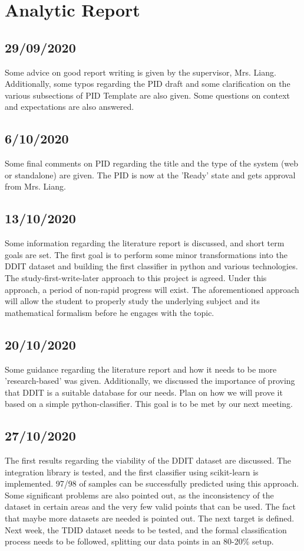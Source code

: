 \documentclass[openany]{article}
\begin{document}
	\section{Analytic Report}
		\subsection{29/09/2020}
			Some advice on good report writing is given by the supervisor, Mrs. Liang. Additionally, some typos regarding the PID draft and some clarification on the various subsections of PID Template are also given. Some questions on context and expectations are also answered.
		\subsection{6/10/2020}
			Some final comments on PID regarding the title and the type of the system (web or standalone) are given. The PID is now at the 'Ready' state and gets approval from Mrs. Liang.
		\subsection{13/10/2020}
			Some information regarding the literature report is discussed, and short term goals are set. The first goal is to perform some minor transformations into the DDIT dataset and building the first classifier in python and various technologies. The study-first-write-later approach to this project is agreed. Under this approach, a period of non-rapid progress will exist. The aforementioned approach will allow the student to properly study the underlying subject and its mathematical formalism before he engages with the topic.
		\subsection{20/10/2020}
			Some guidance regarding the literature report and how it needs to be more 'research-based' was given. Additionally, we discussed the importance of proving that DDIT is a suitable database for our needs. Plan on how we will prove it based on a simple python-classifier. This goal is to be met by our next meeting.
		\subsection{27/10/2020}
			The first results regarding the viability of the DDIT dataset are discussed. The integration library is tested, and the first classifier using scikit-learn is implemented. 97/98 of samples can be successfully predicted using this approach. Some significant problems are also pointed out, as the inconsistency of the dataset in certain areas and the very few valid points that can be used. The fact that maybe more datasets are needed is pointed out. The next target is defined. Next week, the TDID dataset needs to be tested, and the formal classification process needs to be followed, splitting our data points in an 80-20\% setup.
\end{document}
